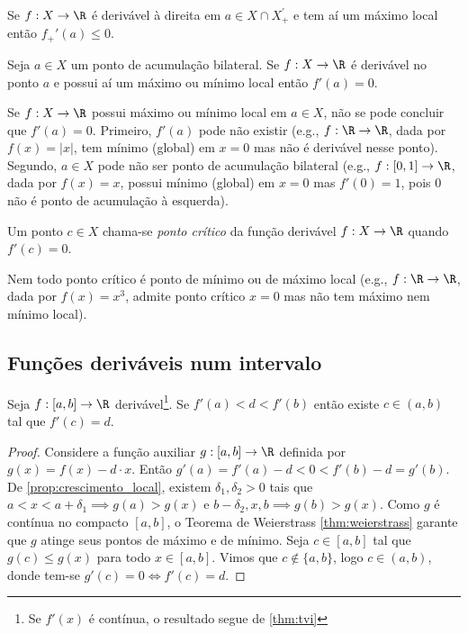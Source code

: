 \documentclass{article}
\begin{document}
\begin{cor}
    Se \(f: X \to \R\) é derivável à direita em \(a \in X \cap X_{+}^{'}\) e tem aí um máximo local então \(f_{+}'(a) \leq 0\).
\end{cor}

\begin{cor} \label{cor:maximos_minimos_derivada_zero}
    Seja \(a \in X\) um ponto de acumulação bilateral. Se \(f : X \to \R\) é derivável no ponto \(a\) e possui aí um máximo ou mínimo local então \(f'(a) = 0\).
\end{cor}

\begin{rem}
    Se \(f: X \to \R\) possui máximo ou mínimo local em \(a \in X\), não se pode concluir que \(f'(a)=0\). Primeiro, \(f'(a)\) pode não existir (e.g., \(f: \R \to \R\), dada por \(f(x)=\vert x \vert\), tem mínimo (global) em \(x=0\) mas não é derivável nesse ponto). Segundo, \(a \in X\) pode não ser ponto de acumulação bilateral (e.g., \(f: [0,1] \to \R\), dada por \(f(x)= x\), possui mínimo (global) em \(x=0\) mas \(f'(0)=1\), pois \(0\) não é ponto de acumulação à esquerda).
\end{rem}

\begin{defn}
    Um ponto \(c \in X\) chama-se \emph{ponto crítico} da função derivável \(f: X \to \R\) quando \(f'(c) = 0\).
\end{defn}

\begin{rem}
    Nem todo ponto crítico é ponto de mínimo ou de máximo local (e.g., \(f: \R \to \R\), dada por \(f(x)=x^3\), admite ponto crítico \(x=0\) mas não tem máximo nem mínimo local).
\end{rem}

\subsection{Funções deriváveis num intervalo}

\begin{thm} 
    Seja \(f: [a,b] \to \R\) derivável\footnote{Se \(f'(x)\) é contínua, o resultado segue de \eqref{thm:tvi}}. Se \(f'(a) < d < f'(b)\) então existe \(c \in (a,b)\) tal que \(f'(c) = d\).
\end{thm}

\begin{proof}
    Considere a função auxiliar \(g: [a,b] \to \R\) definida por \(g(x)=f(x)-d\cdot x\). Então \(g'(a)=f'(a)-d<0<f'(b)-d=g'(b)\). De \eqref{prop:crescimento_local}, existem \(\delta_1, \delta_2 > 0\) tais que \(a<x<a+\delta_1 \implies g(a)>g(x)\) e \(b-\delta_2,x,b \implies g(b)>g(x)\). Como \(g\) é contínua no compacto \([a,b]\), o Teorema de Weierstrass \eqref{thm:weierstrass} garante que \(g\) atinge seus pontos de máximo e de mínimo. Seja \(c \in [a,b]\) tal que \(g(c) \leq g(x)\) para todo \(x \in [a,b]\). Vimos que \(c \notin \{a,b\}\), logo \(c \in (a,b)\), donde tem-se \(g'(c) = 0 \iff f'(c) = d\).
\end{proof}
\end{document}
